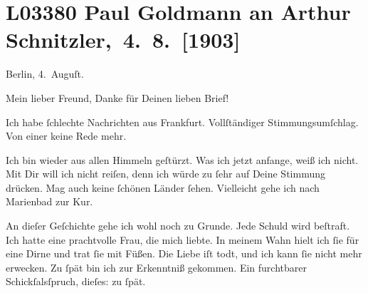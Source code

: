 

\section[ Paul Goldmann an Arthur Schnitzler, 4. 8. {[}1903{]}]{L03380 Paul Goldmann an Arthur Schnitzler, 4. 8. {[}1903{]}}
\nopagebreak{}
\rehead{ }\normalsize\beginnumbering{}
\toendnotes[C]{\smallbreak\pagebreak[2]}
\toendnotes[C]{\smallbreak}
\pstart
           \centering{}{\pb}Berlin, 4. Auguſt.\pend
           
\pstart{}Mein lieber Freund,\pend\vspace{0.5em}
\pstart
           Danke für Deinen lieben Brief!\pend
           
\pstart
           Ich habe ſchlechte Nachrichten aus Frankfurt.
               Vollſtändiger Stimmungsumſchlag. Von einer \label{K_L03380-1v}\label{K_L03380-1} keine Rede mehr.\pend
           
\pstart
           Ich bin wieder aus allen Himmeln geſtürzt. Was ich jetzt anfange, weiß ich nicht. Mit
               Dir will ich nicht reiſen, denn ich würde zu ſehr auf Deine Stimmung drücken. Mag
               auch keine ſchönen Länder ſehen. Vielleicht gehe ich nach Marienbad zur Kur.\pend
           
\pstart
           An dieſer Geſchichte gehe ich wohl noch zu Grunde. Jede Schuld wird beſtraft. Ich
               hatte eine prachtvolle Frau,
               die {\pb}mich liebte. In meinem Wahn hielt ich ſie für eine Dirne und trat
               ſie mit Füßen. Die Liebe iſt todt, und ich kann ſie nicht mehr erwecken. Zu ſpät bin
               ich zur Erkenntniß gekommen. Ein furchtbarer Schickſalsſpruch, dieſes: zu ſpät.\pend
           
